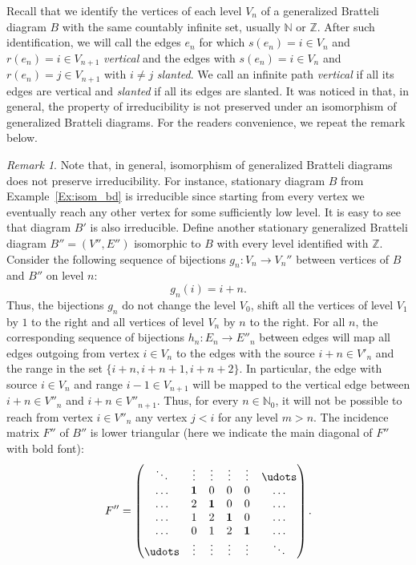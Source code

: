\documentclass[11pt, twoside]{amsart}
\theoremstyle{definition}
\theoremstyle{remark}
\newtheorem{remark}[definition]{Remark}
\theoremstyle{plain}
\newcommand{\tcr}{\textcolor{red}}
\newcommand{\N}{\mathbb N}
\newcommand{\Z}{\mathbb Z}
\numberwithin{equation}{section}
\begin{document}
Recall that we identify the vertices of each level $V_n$ of a generalized Bratteli diagram $B$ with the same countably infinite set, usually $\N$ or $\Z$. 
After such identification,  we will call the edges $e_n$ for which $s(e_n) = i \in V_n$ and $r(e_n) = i \in V_{n+1}$ \textit{vertical} and the edges with $s(e_n) = i \in V_n$ and $r(e_n) = j \in V_{n+1}$ with $i \neq j$ \textit{slanted}. %
We call an infinite path \textit{vertical} if all its edges are vertical and \textit{slanted} if all its edges are slanted. It was noticed in \cite[Remark 2.10]{BezuglyiJorgensenKarpelSanadhya2025} that, in general, the property of irreducibility is not preserved under an isomorphism of generalized Bratteli diagrams. For the readers convenience, we repeat the remark below.


\begin{remark}\label{Rem:isomvsirred}\cite{BezuglyiJorgensenKarpelSanadhya2025}
Note that, in general, isomorphism of generalized Bratteli diagrams does not preserve irreducibility. For instance, stationary diagram $B$ from Example~\ref{Ex:isom_bd} is irreducible since starting from every vertex we eventually reach any other vertex for some sufficiently low level. It is easy to see that diagram $B'$ is also irreducible.
    Define another stationary generalized Bratteli diagram 
$B''=(V'', E'')$ isomorphic to $B$ with every level identified with $\Z$. Consider the following sequence of  bijections $g_n \colon V_n \rightarrow V_n''$ between vertices of $B$ and $B''$ on level $n$:
    $$
    g_n(i) = i + n.
    $$
    Thus, the bijections $g_n$ do not change the level $V_0$, shift all the vertices of level $V_1$ by $1$ to the right and all vertices of level $V_n$ by $n$ to the right. 
    For all $n$, the corresponding sequence of bijections $h_n \colon E_n \rightarrow E''_n$ between edges will map all edges outgoing from vertex $i \in V_n$ to the edges with the source $i + n \in V'_n$ and the range 
   in the set $\{i+n, i+n+1, i+n+2\}.$ 
In particular,
the edge with source $i \in V_n$ and range $i - 1 \in V_{n+1}$ will be mapped to the vertical edge between $i+n \in V''_n$ and $i+n \in V''_{n+1}$. Thus, for every $n \in \N_0$, it will not be possible to reach from vertex $i \in V''_n$ any vertex $j < i$ for any level $m > n$. The incidence matrix $F''$ of $B''$ is lower triangular (here we indicate the main diagonal of $F''$ with bold font):
    $$
    F'' = 
    \begin{pmatrix}
       \ddots & \vdots & \vdots & \vdots & \vdots & \udots\\
       \ldots & \textbf{1} & 0 & 0 & 0 &\ldots\\
       \ldots & {2} & \textbf{1} & 0 & 0 & \ldots\\   
       \ldots & {1} & 2 & \textbf{1} & 0 & \ldots\\ 
       \ldots & 0 & 1 & 2 & \textbf{1} & \ldots\\     
       \udots & \vdots & \vdots & \vdots & \vdots & \ddots
    \end{pmatrix}.
    $$
\end{remark}
\end{document}
